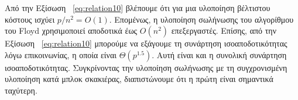 \documentclass[12pt,a4paper]{article} %
\begin{document}
{{Από την Εξίσωση ~\ref{eq:relation10} βλέπουμε ότι για μια υλοποίηση βέλτιστου κόστους ισχύει $p/n^2 = O(1)$. Επομένως, η υλοποίηση σωλήνωσης του αλγορίθμου του Floyd χρησιμοποιεί αποδοτικά έως $O(n^2)$ επεξεργαστές. Επίσης, από την Εξίσωση ~\ref{eq:relation10} μπορούμε να εξάγουμε τη συνάρτηση ισοαποδοτικότητας λόγω επικοινωνίας, η οποία είναι $\Theta(p^{1.5})$. Αυτή είναι και η συνολική συνάρτηση ισοαποδοτικότητας. Συγκρίνοντας την υλοποίηση σωλήνωσης με τη συγχρονισμένη υλοποίηση κατά μπλοκ σκακιέρας, διαπιστώνουμε ότι η πρώτη είναι σημαντικά ταχύτερη.

\begin{table}[h]
\centering
\caption{Η απόδοση και η κλιμακωσιμότητα των αλγορίθμων συντομότερων μονοπατιών όλων των ζευγών σε διάφορες αρχιτεκτονικές.}
\label{tab:performance_and_scalability}
\end{table}}}
\end{document}
